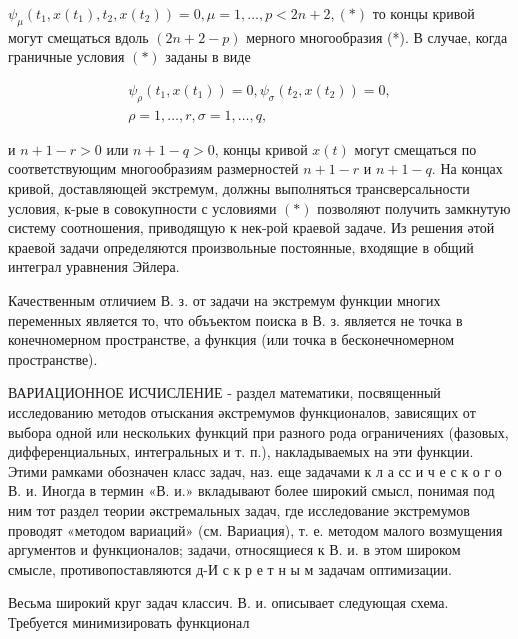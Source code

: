 \documentclass[10pt]{article}
\begin{document}
$\psi_{\mu}\left(t_{1}, x\left(t_{1}\right), t_{2}, x\left(t_{2}\right)\right)=0, \mu=1, \ldots, p<2 n+2,(*)$ то концы кривой могут смещаться вдоль $(2 n+2-p)$ мерного многообразия (*). В случае, когда граничные условия $(*)$ заданы в виде



\[

\begin{gathered}

\psi_{\rho}\left(t_{1}, x\left(t_{1}\right)\right)=0, \psi_{\sigma}\left(t_{2}, x\left(t_{2}\right)\right)=0, \\

\rho=1, \ldots, r, \sigma=1, \ldots, q,

\end{gathered}

\]



и $n+1-r>0$ или $n+1-q>0$, концы кривой $x(t)$ могут смещаться по соответствующим многообразиям размерностей $n+1-r$ и $n+1-q$. На концах кривой, доставляющей экстремум, должны выполняться трансверсальности условия, к-рые в совокупности с условиями $(*)$ позволяют получить замкнутую систему соотношения, приводящую к нек-рой краевой задаче. Из решения әтой краевой задачи определяются произвольные постоянные, входящие в общий интеграл уравнения Эйлера.



Качественным отличием В. з. от задачи на экстремум функции многих переменных является то, что объъектом поиска в В. з. является не точка в конечномерном пространстве, а функция (или точка в бесконечномерном пространстве).



ВАРИАЦИОННОЕ ИСЧИСЛЕНИЕ - раздел математики, посвященный исследованию методов отыскания әкстремумов функционалов, зависящих от выбора одной или нескольких функций при разного рода ограничениях (фазовых, дифференциальных, интегральных и т. п.), накладываемых на эти функции. Этими рамками обозначен класс задач, наз. еще задачами к л а сс и ч е с к о г о В. и. Иногда в термин «В. и.» вкладывают более широкий смысл, понимая под ним тот раздел теории әкстремальных задач, где исследование экстремумов проводят «методом вариаций» (см. Вариация), т. е. методом малого возмущения аргументов и функционалов; задачи, относящиеся к В. и. в этом широком смысле, противопоставляются д-И с к р е т н ы м задачам оптимизации.



Весьма широкий круг задач классич. В. и. описывает следующая схема. Требуется минимизировать функционал
\end{document}
